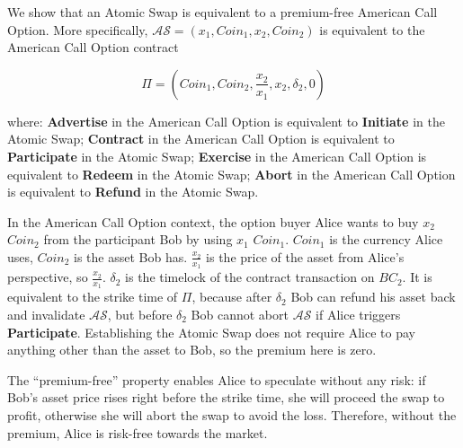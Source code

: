 We show that an Atomic Swap is equivalent to a premium-free American Call Option.
More specifically, $\mathcal{AS} = (x_1, Coin_1, x_2, Coin_2)$ is equivalent to the American Call Option contract

$$
\Pi = (Coin_1, Coin_2, \frac{x_2}{x_1}, x_2, \delta_2, 0)
$$

where:
\textbf{Advertise} in the American Call Option is equivalent to \textbf{Initiate} in the Atomic Swap;
\textbf{Contract} in the American Call Option is equivalent to \textbf{Participate} in the Atomic Swap;
\textbf{Exercise} in the American Call Option is equivalent to \textbf{Redeem} in the Atomic Swap;
\textbf{Abort} in the American Call Option is equivalent to \textbf{Refund} in the Atomic Swap.


In the American Call Option context, the option buyer Alice wants to buy $x_2$ $Coin_2$ from the participant Bob by using $x_1$ $Coin_1$.
$Coin_1$ is the currency Alice uses, $Coin_2$ is the asset Bob has.
$\frac{x_2}{x_1}$ is the price of the asset from Alice's perspective, so $\frac{x_2}{x_1}$.
$\delta_2$ is the timelock of the contract transaction on $BC_2$.
It is equivalent to the strike time of $\Pi$, because after $\delta_2$ Bob can refund his asset back and invalidate $\mathcal{AS}$, but before $\delta_2$ Bob cannot abort $\mathcal{AS}$ if Alice triggers \textbf{Participate}.
Establishing the Atomic Swap does not require Alice to pay anything other than the asset to Bob, so the premium here is zero.

The ``premium-free'' property enables Alice to speculate without any risk:
if Bob's asset price rises right before the strike time, she will proceed the swap to profit,
otherwise she will abort the swap to avoid the loss.
Therefore, without the premium, Alice is risk-free towards the market.